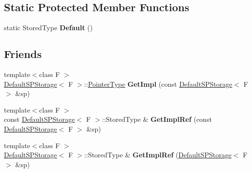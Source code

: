 \subsection*{Static Protected Member Functions}
\begin{DoxyCompactItemize}
\item 
\hypertarget{classLoki_1_1DefaultSPStorage_a1e71d62ec894d43176fd3d6d4683d49b}{}static Stored\+Type {\bfseries Default} ()\label{classLoki_1_1DefaultSPStorage_a1e71d62ec894d43176fd3d6d4683d49b}

\end{DoxyCompactItemize}
\subsection*{Friends}
\begin{DoxyCompactItemize}
\item 
\hypertarget{classLoki_1_1DefaultSPStorage_a7e39b1e9870186f1882781f7e01be33f}{}{\footnotesize template$<$class F $>$ }\\\hyperlink{classLoki_1_1DefaultSPStorage}{Default\+S\+P\+Storage}$<$ F $>$\+::\hyperlink{classLoki_1_1DefaultSPStorage_a70074a5e2fe5b95668d4e5bb0f0909a8}{Pointer\+Type} {\bfseries Get\+Impl} (const \hyperlink{classLoki_1_1DefaultSPStorage}{Default\+S\+P\+Storage}$<$ F $>$ \&sp)\label{classLoki_1_1DefaultSPStorage_a7e39b1e9870186f1882781f7e01be33f}

\item 
\hypertarget{classLoki_1_1DefaultSPStorage_a3c27a1342db7097e7e59493771d260ea}{}{\footnotesize template$<$class F $>$ }\\const \hyperlink{classLoki_1_1DefaultSPStorage}{Default\+S\+P\+Storage}$<$ F $>$\+::Stored\+Type \& {\bfseries Get\+Impl\+Ref} (const \hyperlink{classLoki_1_1DefaultSPStorage}{Default\+S\+P\+Storage}$<$ F $>$ \&sp)\label{classLoki_1_1DefaultSPStorage_a3c27a1342db7097e7e59493771d260ea}

\item 
\hypertarget{classLoki_1_1DefaultSPStorage_aa316c0e2a75103757fe8f66b55df6a5b}{}{\footnotesize template$<$class F $>$ }\\\hyperlink{classLoki_1_1DefaultSPStorage}{Default\+S\+P\+Storage}$<$ F $>$\+::Stored\+Type \& {\bfseries Get\+Impl\+Ref} (\hyperlink{classLoki_1_1DefaultSPStorage}{Default\+S\+P\+Storage}$<$ F $>$ \&sp)\label{classLoki_1_1DefaultSPStorage_aa316c0e2a75103757fe8f66b55df6a5b}

\end{DoxyCompactItemize}


